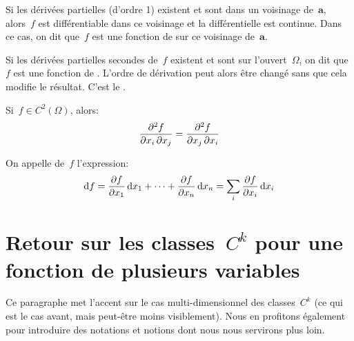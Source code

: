 \medskip
Si  les dérivées partielles (d'ordre 1) existent et sont  dans un voisinage de~$\mathbf{a}$, alors~$f$ est différentiable dans ce voisinage et la différentielle est continue. Dans ce cas, on dit que~$f$ est une fonction de  sur ce voisinage de~$\mathbf{a}$.

Si  les dérivées partielles secondes de~$f$ existent et sont  sur l'ouvert~$\Omega$, on dit que~$f$ est une fonction de .
L'ordre de dérivation peut alors être changé sans que cela modifie le résultat.
C'est le .
\begin{theoreme}
Si~$f\in C^2(\Omega)$, alors:
\begin{equation}\colorred
  \frac{\partial^2f}{\partial x_i\, \partial x_j} = \frac{\partial^2f} {\partial x_j\, \partial x_i}
\end{equation}
\end{theoreme}

\begin{definition}
On appelle  de~$f$ l'expression:
\begin{equation}
  \text{d} f=\frac{\partial f}{\partial x_1}\,\text{d} x_1+\cdots+\frac{\partial f}{\partial x_n}\,\text{d} x_n
=  \displaystyle\sum_i \frac{\partial f}{\partial x_i}\,\text{d} x_i
\end{equation}
\end{definition}

\medskip
\section{Retour sur les classes~$C^k$ pour une fonction de plusieurs variables}

Ce paragraphe met l'accent sur le cas multi-dimensionnel des classes~$C^k$ (ce qui est le cas avant, mais peut-être moins visiblement). Nous en profitons également pour introduire des notations et notions dont nous nous servirons plus loin.

